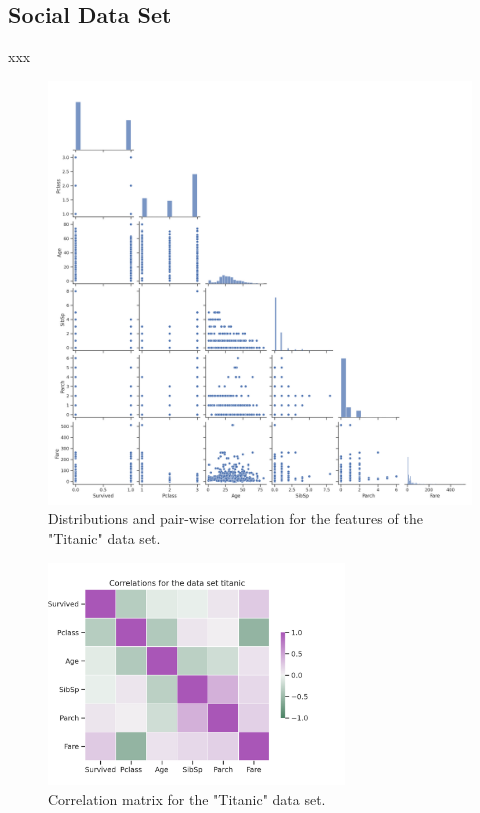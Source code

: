 \documentclass{article}
\begin{document}
\subsection{Social Data Set}
xxx

\begin{figure}[h!]
	\centering
	\includegraphics[width=\textwidth]{../plots/titanic_pairplot.png}
	\caption{ Distributions and pair-wise correlation for the features of the "Titanic" data set.}
	\label{pairplot_income}
\end{figure}


\begin{figure}[h!]
	\centering
	\includegraphics[width=0.7\textwidth]{../plots/titanic_correlations.png}
	\caption{Correlation matrix for the "Titanic" data set. }
	\label{correlation_income}
\end{figure}
\end{document}
